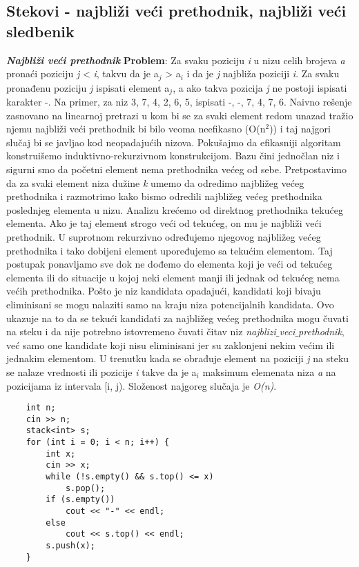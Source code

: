 \documentclass{article}
\begin{document}
\subsection{Stekovi - najbliži veći prethodnik, najbliži veći sledbenik}
\textit{\textbf{Najbliži veći prethodnik}}
\newline \textbf{Problem}: Za svaku poziciju \textit{i} u nizu celih brojeva \textit{a} pronaći poziciju \textit{j} < \textit{i},
takvu da je a$_j$ > a$_i$ i da je \textit{j} najbliža poziciji \textit{i}. Za svaku
pronađenu poziciju \textit{j} ispisati element a$_j$, a ako takva pozicija \textit{j} ne postoji ispisati karakter -. Na primer, za niz 3, 7, 4, 2, 6, 5, ispisati -, -, 7, 4, 7, 6.
\newline Naivno rešenje zasnovano na linearnoj pretrazi u kom bi se za svaki element
redom unazad tražio njemu najbliži veći prethodnik bi bilo veoma neefikasno (O(n$^2$)) i taj najgori slučaj bi se javljao kod neopadajućih nizova.
\newline Pokušajmo da efikasniji algoritam konstruišemo induktivno-rekurzivnom konstrukcijom. Bazu čini jednočlan niz i sigurni smo da početni element nema prethodnika
većeg od sebe. Pretpostavimo da za svaki element niza dužine \textit{k} umemo da odredimo
najbližeg većeg prethodnika i razmotrimo kako bismo odredili najbližeg
većeg prethodnika poslednjeg elementa u nizu.
Analizu krećemo od direktnog prethodnika tekućeg elementa. Ako je taj element strogo veći od
tekućeg, on mu je najbliži veći prethodnik.
U suprotnom rekurzivno određujemo njegovog najbližeg većeg prethodnika
i tako dobijeni element upoređujemo sa tekućim elementom. Taj postupak
ponavljamo sve dok ne dođemo do elementa koji je veći od tekućeg elementa
ili do situacije u kojoj neki element manji ili jednak od tekućeg nema većih
prethodnika. 
\newline Pošto je niz kandidata opadajući, kandidati koji bivaju eliminisani se mogu nalaziti samo na kraju niza potencijalnih kandidata. Ovo ukazuje na
to da se tekući kandidati za najbližeg većeg prethodnika mogu čuvati na steku
i da nije potrebno istovremeno čuvati čitav niz \textit{najblizi$\_$veci$\_$prethodnik},
već samo one kandidate koji nisu eliminisani jer su zaklonjeni nekim većim ili
jednakim elementom. U trenutku kada se obrađuje element na poziciji \textit{j} na steku
se nalaze vrednosti ili pozicije \textit{i} takve da je a$_i$ maksimum elemenata niza \textit{a}
na pozicijama iz intervala [i, j). Složenost najgoreg slučaja je \textit{O(n)}.
\begin{lstlisting}
    int n;
    cin >> n;
    stack<int> s;
    for (int i = 0; i < n; i++) {
        int x;
        cin >> x;
        while (!s.empty() && s.top() <= x)
            s.pop();
        if (s.empty())
            cout << "-" << endl;
        else
            cout << s.top() << endl;
        s.push(x);
    }
\end{lstlisting}
\end{document}
